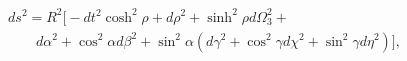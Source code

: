 \begin{equation}        \label{eq:AdS5S5}
\begin{array}{l}
ds^2 = R^2 \Big[ 
-dt^2 \cosh^2 \rho +  d \rho^2 + \sinh^2 \rho d \Omega_3^2 +  \\
\qquad
d \alpha^2 + \cos^2 \alpha d \beta^2 +      
\sin^2 \alpha \left( d \gamma^2  + \cos^2 \gamma d\chi^2 
                     + \sin^2 \gamma d \eta^2 \right)  \Big],
\end{array}
\end{equation}

